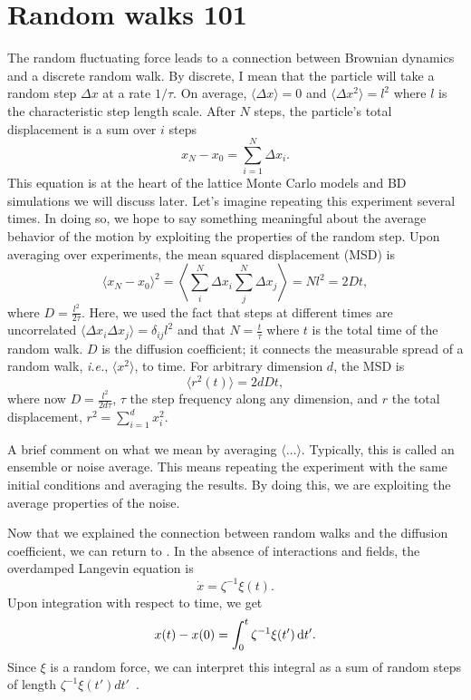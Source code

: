 \section{Random walks 101}
The random fluctuating force leads to a connection between Brownian dynamics and
a discrete random walk. By discrete, I mean that the particle will take a random
step $\Delta x$ at a rate $ 1 / \tau $. On average, $\langle \Delta x \rangle =
0$ and $\langle \Delta x^2 \rangle = l^2$ where $l$ is the characteristic step
length scale.  After $N$ steps, the particle's total displacement is a sum over
$i$ steps
%
\begin{equation}
  x_N - x_0 = \sum^N_{i=1} \Delta x_i.
\end{equation}
%
This equation is at the heart of the lattice Monte Carlo models and BD
simulations we will discuss later.  Let's imagine repeating this experiment
several times.  In doing so, we hope to say something meaningful about the
average behavior of the motion by exploiting the properties of the random step.
Upon averaging over experiments, the mean squared displacement (MSD) is
%
\begin{equation}
  \langle x_N - x_0 \rangle^2 = 
  \left \langle \sum_i^N \Delta x_i\sum_j^N \Delta x_j \right \rangle 
  = N l^2  = 2 D t,
\end{equation}
%
where $D = \frac{l^2}{2 \tau}$. Here, we used the fact that steps at different
times are uncorrelated $ \langle \Delta x_i \Delta x_j \rangle = \delta_{ij} l^2
$ and that $N = \frac{t}{\tau}$ where $t$ is the total time of the random walk.
$D$ is the diffusion coefficient; it connects the measurable spread of a random
walk, \textit{i.e.}, $\langle x^2 \rangle$, to time.  For arbitrary dimension
$d$, the MSD is
%
\begin{equation}
  \label{eqn:msd}
  \langle r^2(t) \rangle = 2dDt,
\end{equation}
%
where now $ D = \frac{l^2}{2d\tau} $, $\tau$ the step frequency along any
dimension, and $r$ the total displacement, $r^2 = \sum_{i=1}^d x_i^2$.

A brief comment on what we mean by averaging $\langle \ldots \rangle$.
Typically, this is called an ensemble or noise average.  This means repeating
the experiment with the same initial conditions and averaging the results.  By
doing this, we are exploiting the average properties of the noise.

Now that we explained the connection between random walks and the diffusion
coefficient, we can return to . In the absence of
interactions and fields, the overdamped Langevin equation is
%
\begin{equation}
  \dot{x} = \zeta^{-1} \xi(t).
\end{equation}
%
Upon integration with respect to time, we get
%
\begin{equation}
  \label{eqn:brownian_int}
  x(t) - x(0) =  \int_0^t \zeta^{-1} \xi(t') \mathop{}\!\mathrm{d} t'.
\end{equation}
%
Since $\xi$ is a random force, we can interpret this integral as a sum of random
steps of length $ \zeta^{-1} \xi(t') dt'$~\cite{doi_theory_88}. 

